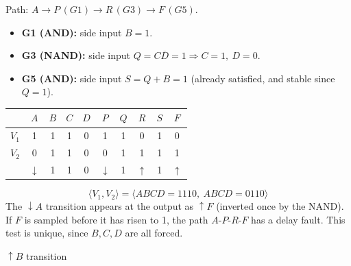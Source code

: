 \documentclass[a4paper, 10pt]{article}
\begin{document}
\begin{solution}
	\noindent Path: \( A \to P\,(G1) \to R\,(G3) \to F\,(G5) \).
	\begin{itemize}
		\item \textbf{G1 (AND):} side input \( B = 1 \).
		\item \textbf{G3 (NAND):} side input \( Q = C\overline{D} = 1 \Rightarrow C = 1,\ D = 0 \).
		\item \textbf{G5 (AND):} side input \( S = Q + B = 1 \) (already satisfied, and stable since \( Q = 1 \)).
	\end{itemize}
	\begin{center}
		\begin{tabular}{c|cccc|cccc|c}
			\toprule
			          & \( A \)          & \( B \) & \( C \) & \( D \) & \( P \)          & \( Q \) & \( R \)        & \( S \) & \( F \)        \\
			\midrule
			\( V_1 \) & 1                & 1       & 1       & 0       & 1                & 1       & 0              & 1       & 0              \\
			\( V_2 \) & 0                & 1       & 1       & 0       & 0                & 1       & 1              & 1       & 1              \\
			\midrule
			          & \( \downarrow \) & 1       & 1       & 0       & \( \downarrow \) & 1       & \( \uparrow \) & 1       & \( \uparrow \) \\
			\bottomrule
		\end{tabular}
	\end{center}
	\[ \boxed{\langle V_1, V_2 \rangle = \langle ABCD = 1110,\ ABCD = 0110 \rangle} \]
	The \( \downarrow A \) transition appears at the output as \( \uparrow F \) (inverted once by the NAND).
	If \( F \) is sampled before it has risen to 1, the path \( A\text{-}P\text{-}R\text{-}F \) has a delay fault.
	This test is unique, since \( B, C, D \) are all forced.
\end{solution}

\newpage

\begin{problem}
\( \uparrow B \) transition
\end{problem}
\end{document}
